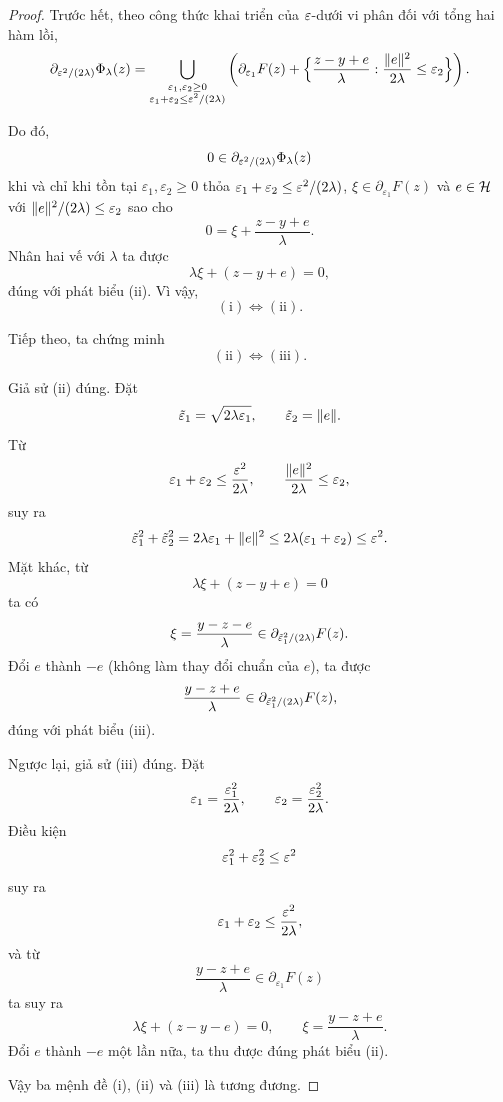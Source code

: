 \begin{essayonly}
\begin{proof}
Trước hết, theo công thức khai triển của $\varepsilon$-dưới vi phân đối với tổng hai hàm lồi,
\[
\partial_{\varepsilon^2/(2\lambda)}\Phi_\lambda(z)
=
\bigcup_{\substack{\varepsilon_1,\varepsilon_2\ge0\\
\varepsilon_1+\varepsilon_2\le\varepsilon^2/(2\lambda)}}
\left(
\partial_{\varepsilon_1}F(z)
+
\Bigl\{
\frac{z-y+e}{\lambda}:
\frac{\lVert e\rVert^2}{2\lambda}\le\varepsilon_2
\Bigr\}
\right).
\]

Do đó,
\[
0\in\partial_{\varepsilon^2/(2\lambda)}\Phi_\lambda(z)
\]
khi và chỉ khi tồn tại
$\varepsilon_1,\varepsilon_2\ge0$ thỏa
$\varepsilon_1+\varepsilon_2\le\varepsilon^2/(2\lambda)$,
$\xi\in\partial_{\varepsilon_1}F(z)$ và
$e\in\mathcal{H}$ với
$\lVert e\rVert^2/(2\lambda)\le\varepsilon_2$ sao cho
\[
0
=
\xi+\frac{z-y+e}{\lambda}.
\]
Nhân hai vế với $\lambda$ ta được
\[
\lambda\xi+(z-y+e)=0,
\]
đúng với phát biểu (ii). Vì vậy,
\[
\mathrm{(i)}
\Longleftrightarrow
\mathrm{(ii)}.
\]

Tiếp theo, ta chứng minh
\[
\mathrm{(ii)}
\Longleftrightarrow
\mathrm{(iii)}.
\]

Giả sử (ii) đúng. Đặt
\[
\tilde{\varepsilon}_1=\sqrt{2\lambda\varepsilon_1},
\qquad
\tilde{\varepsilon}_2=\lVert e\rVert.
\]
Từ
\[
\varepsilon_1+\varepsilon_2
\le
\frac{\varepsilon^2}{2\lambda},
\qquad
\frac{\lVert e\rVert^2}{2\lambda}
\le
\varepsilon_2,
\]
suy ra
\[
\tilde{\varepsilon}_1^2+\tilde{\varepsilon}_2^2
=
2\lambda\varepsilon_1+\lVert e\rVert^2
\le
2\lambda(\varepsilon_1+\varepsilon_2)
\le
\varepsilon^2.
\]
Mặt khác, từ
\[
\lambda\xi+(z-y+e)=0
\]
ta có
\[
\xi
=
\frac{y-z-e}{\lambda}
\in
\partial_{\tilde{\varepsilon}_1^2/(2\lambda)}F(z).
\]
Đổi $e$ thành $-e$ (không làm thay đổi chuẩn của $e$), ta được
\[
\frac{y-z+e}{\lambda}
\in
\partial_{\tilde{\varepsilon}_1^2/(2\lambda)}F(z),
\]
đúng với phát biểu (iii).

Ngược lại, giả sử (iii) đúng. Đặt
\[
\varepsilon_1=\frac{\varepsilon_1^2}{2\lambda},
\qquad
\varepsilon_2=\frac{\varepsilon_2^2}{2\lambda}.
\]
Điều kiện
\[
\varepsilon_1^2+\varepsilon_2^2\le\varepsilon^2
\]
suy ra
\[
\varepsilon_1+\varepsilon_2
\le
\frac{\varepsilon^2}{2\lambda},
\]
và từ
\[
\frac{y-z+e}{\lambda}
\in
\partial_{\varepsilon_1}F(z)
\]
ta suy ra
\[
\lambda\xi+(z-y-e)=0,
\qquad
\xi=\frac{y-z+e}{\lambda}.
\]
Đổi $e$ thành $-e$ một lần nữa, ta thu được đúng phát biểu (ii).

Vậy ba mệnh đề (i), (ii) và (iii) là tương đương.
\end{proof}
\end{essayonly}

